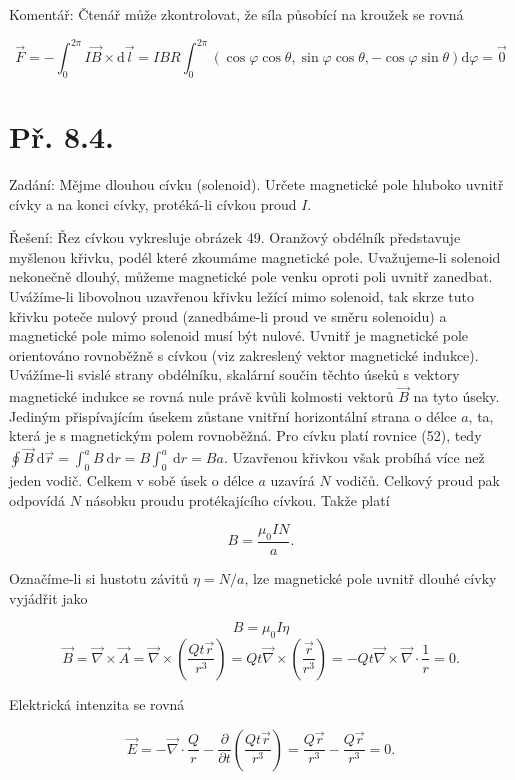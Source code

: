 \documentclass[czech,11pt,a4paper]{article}
\begin{document}
Komentář: Čtenář může zkontrolovat, že síla působící na kroužek se rovná

$$
\vec{F}=-\int_{0}^{2 \pi} I \vec{B} \times \mathrm{d} \vec{l}=I B R \int_{0}^{2 \pi}(\cos \varphi \cos \theta, \sin \varphi \cos \theta,-\cos \varphi \sin \theta) \mathrm{d} \varphi=\overrightarrow{0}
$$
\section{Př. 8.4.}

Zadání: Mějme dlouhou cívku (solenoid). Určete magnetické pole hluboko uvnitř cívky a na konci cívky, protéká-li cívkou proud $I$.

Řešení: Řez cívkou vykresluje obrázek 49. Oranžový obdélník představuje myšlenou křivku, podél které zkoumáme magnetické pole. Uvažujeme-li solenoid nekonečně dlouhý, můžeme magnetické pole venku oproti poli uvnitř zanedbat. Uvážíme-li libovolnou uzavřenou křivku ležící mimo solenoid, tak skrze tuto křivku poteče nulový proud (zanedbáme-li proud ve směru solenoidu) a magnetické pole mimo solenoid musí být nulové. Uvnitř je magnetické pole orientováno rovnoběžně s cívkou (viz zakreslený vektor magnetické indukce). Uvážíme-li svislé strany obdélníku, skalární součin těchto úseků s vektory magnetické indukce se rovná nule právě kvůli kolmosti vektorů $\vec{B}$ na tyto úseky. Jediným přispívajícím úsekem zůstane vnitřní horizontální strana o délce $a$, ta, která je s magnetickým polem rovnoběžná. Pro cívku platí rovnice (52), tedy $\oint \vec{B} \mathrm{~d} \vec{r}=\int_{0}^{a} B \mathrm{~d} r=B \int_{0}^{a} \mathrm{~d} r=B a$. Uzavřenou křivkou však probíhá více než jeden vodič. Celkem v sobě úsek o délce $a$ uzavírá $N$ vodičů. Celkový proud pak odpovídá $N$ násobku proudu protékajícího cívkou. Takže platí

$$
B=\frac{\mu_{0} I N}{a} .
$$

Označíme-li si hustotu závitů $\eta=N / a$, lze magnetické pole uvnitř dlouhé cívky vyjádřit jako

$$
B=\mu_{0} I \eta
$$
$$
\vec{B}=\vec{\nabla} \times \vec{A}=\vec{\nabla} \times\left(\frac{Q t \vec{r}}{r^{3}}\right)=Q t \vec{\nabla} \times\left(\frac{\vec{r}}{r^{3}}\right)=-Q t \vec{\nabla} \times \vec{\nabla} \cdot \frac{1}{r}=0 .
$$

Elektrická intenzita se rovná

$$
\vec{E}=-\vec{\nabla} \cdot \frac{Q}{r}-\frac{\partial}{\partial t}\left(\frac{Q t \vec{r}}{r^{3}}\right)=\frac{Q \vec{r}}{r^{3}}-\frac{Q \vec{r}}{r^{3}}=0 .
$$
\end{document}
